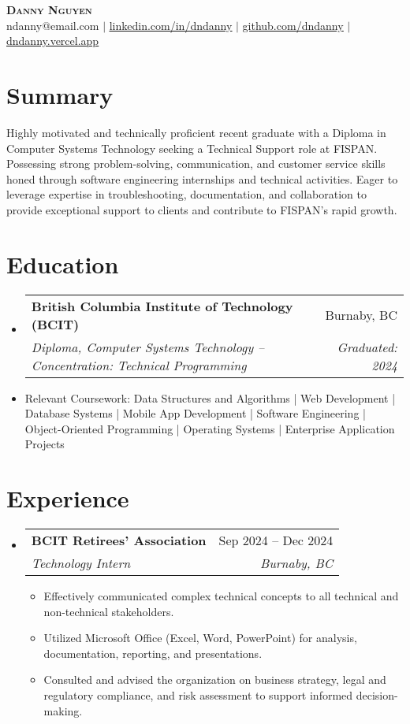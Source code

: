 \documentclass[letterpaper,11pt]{article}
\makeatletter
\newcommand{\resumeItem}[1]{
\item\small{
{#1 \vspace{-2pt}}
}
}
\newcommand{\resumeSubheading}[4]{
\vspace{-2pt}\item
\begin{tabular*}{0.97\textwidth}[t]{l@{\extracolsep{\fill}}r}
\textbf{#1} & #2 \\
\textit{\small#3} & \textit{\small #4} \\
\end{tabular*}\vspace{-7pt}
}
\newcommand{\resumeSubHeadingListStart}{\begin{itemize}[leftmargin=0.15in, label={}]}
\newcommand{\resumeSubHeadingListEnd}{\end{itemize}}
\newcommand{\resumeItemListStart}{\begin{itemize}}
\newcommand{\resumeItemListEnd}{\end{itemize}\vspace{-5pt}}
\makeatother
\begin{document}
\begin{center}
\textbf{\Huge \scshape Danny Nguyen} \\ \vspace{1pt}
\small ndanny@email.com $|$ \href{https://linkedin.com/in/dndanny}{\underline{linkedin.com/in/dndanny}} $|$
\href{https://github.com/dndanny}{\underline{github.com/dndanny}} $|$
\href{https://dndanny.vercel.app}{\underline{dndanny.vercel.app}}
\end{center}


\section{Summary}
Highly motivated and technically proficient recent graduate with a Diploma in Computer Systems Technology seeking a Technical Support role at FISPAN. Possessing strong problem-solving, communication, and customer service skills honed through software engineering internships and technical activities. Eager to leverage expertise in troubleshooting, documentation, and collaboration to provide exceptional support to clients and contribute to FISPAN's rapid growth.

\section{Education}
\resumeSubHeadingListStart
\resumeSubheading{British Columbia Institute of Technology (BCIT)}{Burnaby, BC}{Diploma, Computer Systems Technology – Concentration: Technical Programming}{Graduated: 2024}
\resumeItem{Relevant Coursework: Data Structures and Algorithms | Web Development | Database Systems | Mobile App Development | Software Engineering | Object-Oriented Programming | Operating Systems | Enterprise Application Projects}
\resumeSubHeadingListEnd

\section{Experience}
\resumeSubHeadingListStart
\resumeSubheading{BCIT Retirees’ Association}{Sep 2024 – Dec 2024}{Technology Intern}{Burnaby, BC}
\resumeItemListStart
\resumeItem{Effectively communicated complex technical concepts to all technical and non-technical stakeholders.}
\resumeItem{Utilized Microsoft Office (Excel, Word, PowerPoint) for analysis, documentation, reporting, and presentations.}
\resumeItem{Consulted and advised the organization on business strategy, legal and regulatory compliance, and risk assessment to support informed decision-making.}
\resumeItemListEnd
\resumeSubHeadingListEnd
\end{document}
